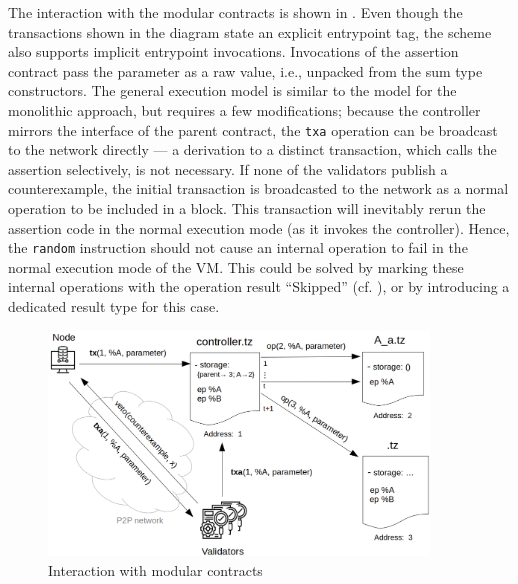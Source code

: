 The interaction with the modular contracts is shown in . Even though the transactions shown in the diagram state an explicit entrypoint tag, the scheme also supports implicit entrypoint invocations. Invocations of the assertion contract pass the parameter as a raw value, i.e., unpacked from the sum type constructors. The general execution model is similar to the model for the monolithic approach, but requires a few modifications; because the controller mirrors the interface of the parent contract, the \texttt{txa} operation can be broadcast to the network directly --- a derivation to a distinct transaction, which calls the assertion selectively, is not necessary. If none of the validators publish a counterexample, the initial transaction is broadcasted to the network as a normal operation to be included in a block. This transaction will inevitably rerun the assertion code in the normal execution mode (as it invokes the controller). Hence, the \texttt{random} instruction should not cause an internal operation to fail in the normal execution mode of the VM. This could be solved by marking these internal operations with the operation result ``Skipped'' (cf. ), or by introducing a dedicated result type for this case. 
\begin{figure}[h]
\centering
  \includegraphics[width=0.9\textwidth]{figures/5-offline_tezos/interaction_modular.png}
	\caption{Interaction with modular contracts}
	\label{fig:interaction_modular}
\end{figure}

